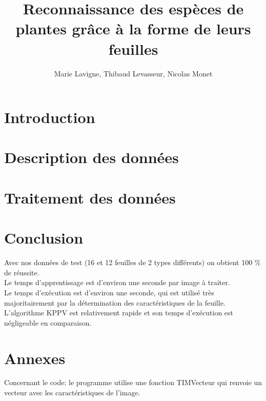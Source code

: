 \documentclass{article}
\title{Reconnaissance des espèces de plantes grâce à la forme de leurs feuilles}
\author{Marie Lavigne, Thibaud Levasseur, Nicolas Monet}
\begin{document}
\maketitle
\newpage
\tableofcontents
\newpage
\section{Introduction}

\newpage

\section{Description des données}

\section{Traitement des données}



\newpage
\section{Conclusion}
Avec nos données de test (16 et 12 feuilles de 2 types différents) on obtient 100 \% de réussite.\\
Le temps d'apprentissage est d'environ une seconde par image à traiter. \\
Le temps d'exécution est d'environ une seconde, qui est utilisé très majoritairement par la détermination des caractéristiques de la feuille. L'algorithme KPPV est relativement rapide et son temps d'exécution est négligeable en comparaison.
\newpage
\section{Annexes}
Concernant le code: le programme utilise une fonction TIMVecteur qui renvoie un vecteur avec les caractéristiques de l'image.
\end{document}
